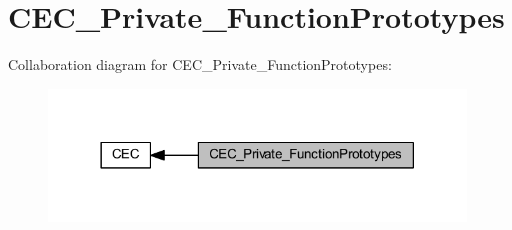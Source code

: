 \hypertarget{group___c_e_c___private___function_prototypes}{}\section{C\+E\+C\+\_\+\+Private\+\_\+\+Function\+Prototypes}
\label{group___c_e_c___private___function_prototypes}
Collaboration diagram for C\+E\+C\+\_\+\+Private\+\_\+\+Function\+Prototypes\+:
\nopagebreak
\begin{figure}[H]
\begin{center}
\leavevmode
\includegraphics[width=314pt]{group___c_e_c___private___function_prototypes}
\end{center}
\end{figure}
